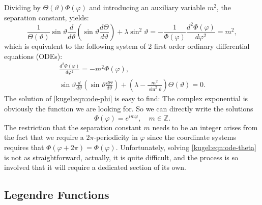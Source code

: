 Dividing by $\Theta(\vartheta)\Phi(\varphi)$ and introducing an auxiliary
variable $m^2$, the separation constant, yields:
\begin{equation*}
  \frac{1}{\Theta(\vartheta)}\sin \vartheta \frac{d}{d \vartheta} \left(
    \sin \vartheta \frac{d \Theta}{d \vartheta}
  \right)
  + \lambda \sin^2 \vartheta
  = -\frac{1}{\Phi(\varphi)} \frac{d^2\Phi(\varphi)}{d\varphi^2}
  = m^2,
\end{equation*}
which is equivalent to the following system of 2 first order ordinary
differential equations (ODEs):
\begin{subequations}
  \begin{gather}
    \frac{d^2\Phi(\varphi)}{d\varphi^2} = -m^2 \Phi(\varphi),
      \label{kugel:eqn:ode-phi} \\ 
    \sin \vartheta \frac{d}{d \vartheta} \left(
      \sin \vartheta \frac{d \Theta}{d \vartheta}
    \right)
    + \left( \lambda - \frac{m^2}{\sin^2 \vartheta} \right)
      \Theta(\vartheta) = 0
      \label{kugel:eqn:ode-theta}.
  \end{gather}
\end{subequations}
The solution of \eqref{kugel:eqn:ode-phi} is easy to find: The complex
exponential is obviously the function we are looking for. So we can directly
write the solutions
\begin{equation} \label{kugel:eqn:ode-phi-sol}
    \Phi(\varphi) = e^{i m \varphi}, \quad m \in \mathbb{Z}.
\end{equation}
The restriction that the separation constant $m$ needs to be an integer arises
from the fact that we require a $2\pi$-periodicity in $\varphi$ since the
coordinate systems requires that $\Phi(\varphi + 2\pi) = \Phi(\varphi)$.
Unfortunately, solving \eqref{kugel:eqn:ode-theta} is not as straightforward,
actually, it is quite difficult, and the process is so involved that it will
require a dedicated section of its own.

\subsection{Legendre Functions}

